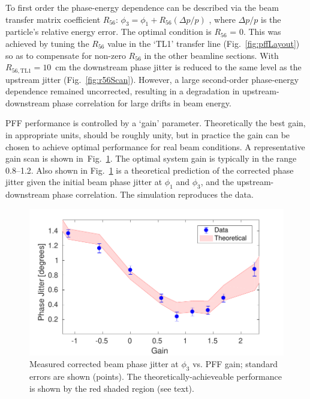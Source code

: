\documentclass[%
 reprint,
 superscriptaddress,
 amsmath,
 amssymb,
 prl,
]{revtex4-1}
\begin{document}
To first order the phase-energy dependence can be described via the beam 
transfer matrix coefficient 
\(R_{56}\): \(\phi_3 = \phi_1 + R_{56}(\Delta p / p)\)
, where \(\Delta p / p\) is the particle's relative energy error.
The optimal condition is \(R_{56}\) = 0.
This was achieved by tuning the \(R_{56}\) value in the `TL1' transfer line 
(Fig.~\ref{fig:pffLayout}) so as to compensate for non-zero \(R_{56}\) in the 
other beamline sections. With \(R_{56, \mathrm{TL1}}=10\)~cm the 
downstream phase jitter is reduced to the same level as the upstream jitter 
(Fig.~\ref{fig:r56Scan}). 
However, a large second-order phase-energy dependence remained uncorrected, 
resulting in a degradation in upstream-downstream phase correlation for large 
drifts in beam energy.

PFF performance is controlled by a ‘gain’ parameter. 
Theoretically the best gain, in appropriate units, should 
be roughly unity, but in practice the gain can be chosen to achieve optimal 
performance for real beam conditions. A representative gain scan is shown 
in~Fig.~\ref{fig:gScan}. The optimal system gain is typically in the range 
0.8--1.2. Also shown in Fig.~\ref{fig:gScan} is a theoretical prediction of the 
corrected phase jitter given the initial beam phase jitter at \(\phi_1\) and 
\(\phi_3\), and the upstream-downstream phase correlation. The simulation 
reproduces the data.

\begin{figure}
\includegraphics[width=\columnwidth]{figs/gScan}
\caption{\label{fig:gScan}Measured corrected beam  phase jitter at \(\phi_3\) 
vs. PFF gain; standard errors are shown (points). The theoretically-achieveable 
performance is shown by the red shaded region (see text).}
\end{figure}
\end{document}
